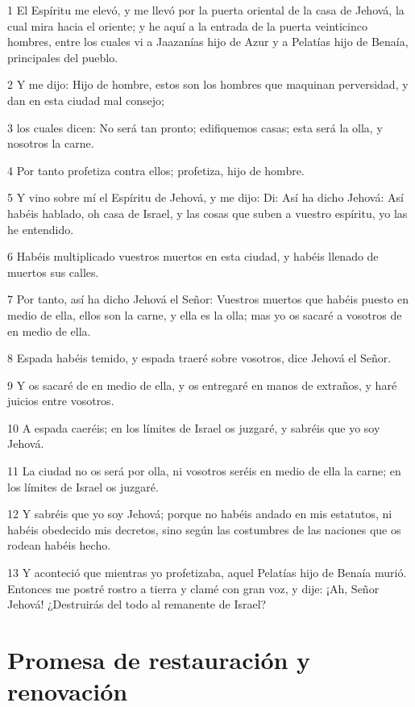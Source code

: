 \par 1 El Espíritu me elevó, y me llevó por la puerta oriental de la casa de Jehová, la cual mira hacia el oriente; y he aquí a la entrada de la puerta veinticinco hombres, entre los cuales vi a Jaazanías hijo de Azur y a Pelatías hijo de Benaía, principales del pueblo.
\par 2 Y me dijo: Hijo de hombre, estos son los hombres que maquinan perversidad, y dan en esta ciudad mal consejo;
\par 3 los cuales dicen: No será tan pronto; edifiquemos casas; esta será la olla, y nosotros la carne.
\par 4 Por tanto profetiza contra ellos; profetiza, hijo de hombre.
\par 5 Y vino sobre mí el Espíritu de Jehová, y me dijo: Di: Así ha dicho Jehová: Así habéis hablado, oh casa de Israel, y las cosas que suben a vuestro espíritu, yo las he entendido.
\par 6 Habéis multiplicado vuestros muertos en esta ciudad, y habéis llenado de muertos sus calles.
\par 7 Por tanto, así ha dicho Jehová el Señor: Vuestros muertos que habéis puesto en medio de ella, ellos son la carne, y ella es la olla; mas yo os sacaré a vosotros de en medio de ella.
\par 8 Espada habéis temido, y espada traeré sobre vosotros, dice Jehová el Señor.
\par 9 Y os sacaré de en medio de ella, y os entregaré en manos de extraños, y haré juicios entre vosotros.
\par 10 A espada caeréis; en los límites de Israel os juzgaré, y sabréis que yo soy Jehová.
\par 11 La ciudad no os será por olla, ni vosotros seréis en medio de ella la carne; en los límites de Israel os juzgaré.
\par 12 Y sabréis que yo soy Jehová; porque no habéis andado en mis estatutos, ni habéis obedecido mis decretos, sino según las costumbres de las naciones que os rodean habéis hecho.
\par 13 Y aconteció que mientras yo profetizaba, aquel Pelatías hijo de Benaía murió. Entonces me postré rostro a tierra y clamé con gran voz, y dije: ¡Ah, Señor Jehová! ¿Destruirás del todo al remanente de Israel?

\section*{Promesa de restauración y renovación}

